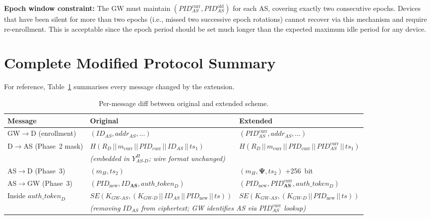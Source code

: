 \documentclass[12pt,a4paper]{article}
\newcommand{\IDas}{\mathit{ID}_{AS}}
\newcommand{\PIDcurr}{\mathit{PID}_{\mathrm{curr}}}
\newcommand{\PIDnew}{\mathit{PID}_{\mathrm{new}}}
\newcommand{\PIDascurr}{\mathit{PID}_{AS}^{\mathrm{curr}}}
\newcommand{\PIDASOld}{\mathit{PID}_{AS}^{\mathrm{old}}}
\newcommand{\mcurr}{m_{\mathrm{curr}}}
\newcommand{\KGWd}{K_{GW\text{-}D}}
\newcommand{\KGWas}{K_{GW\text{-}AS}}
\newcommand{\YASDhH}{Y_{AS\text{-}D}^{H}}
\newcommand{\Rd}{R_D}
\newcommand{\authtoken}{\mathit{auth\_token}_D}
\newcommand{\SE}{\mathit{SE}}
\begin{document}
\noindent\textbf{Epoch window constraint:}
The GW must maintain $(\PIDascurr, \PIDASOld)$ for each AS, covering
exactly two consecutive epochs.  Devices that have been silent for
more than two epochs (i.e., missed two successive epoch rotations)
cannot recover via this mechanism and require re-enrollment.
This is acceptable since the epoch period should be set much longer
than the expected maximum idle period for any device.

\section{Complete Modified Protocol Summary}

For reference, Table~\ref{tab:protocol-diff} summarises every message
changed by the extension.

\begin{table}[H]
\caption{Per-message diff between original and extended scheme.}
\label{tab:protocol-diff}
\centering
\renewcommand{\arraystretch}{1.4}
\begin{tabularx}{\textwidth}{@{}lXX@{}}
\toprule
\textbf{Message} & \textbf{Original} & \textbf{Extended} \\
\midrule
GW$\to$D (enrollment)
  & $(\IDas, \mathit{addr}_{AS}, \ldots)$
  & $(\PIDascurr, \mathit{addr}_{AS}, \ldots)$ \\
\midrule
D$\to$AS (Phase~2 mask)
  & $H(\Rd \,||\, \mcurr \,||\, \PIDcurr \,||\, \IDas \,||\, ts_1)$
  & $H(\Rd \,||\, \mcurr \,||\, \PIDcurr \,||\, \PIDascurr \,||\, ts_1)$ \\
  & \multicolumn{2}{l}{\small\textit{(embedded in $\YASDhH$; wire format unchanged)}} \\
\midrule
AS$\to$D (Phase~3)
  & $(m_H, ts_2)$
  & $(m_H, \boldsymbol{\Psi}, ts_2)$ \quad +256~bit \\
\midrule
AS$\to$GW (Phase~3)
  & $(\PIDnew, \boldsymbol{\IDas}, \authtoken)$
  & $(\PIDnew, \boldsymbol{\PIDascurr}, \authtoken)$ \\
\midrule
Inside $\authtoken$
  & $\SE(\KGWas, (\KGWd \,||\, \IDas \,||\, \PIDnew \,||\, ts))$
  & $\SE(\KGWas, (\KGWd \,||\, \PIDnew \,||\, ts))$ \\
  & \multicolumn{2}{l}{\small\textit{(removing $\IDas$ from ciphertext;
    GW identifies AS via $\PIDascurr$ lookup)}} \\
\bottomrule
\end{tabularx}
\end{table}
\end{document}
